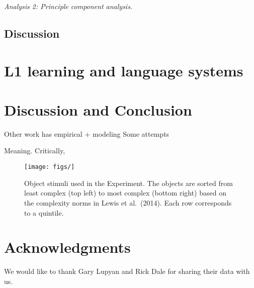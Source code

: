 \documentclass[10pt,letterpaper]{article}
\newcommand{\squeezeup}{\vspace{-1.5mm}}
\begin{document}
{\it Analysis 2: Principle component analysis.}

\subsection{Discussion}



\section{L1 learning and language systems}
\cite{luniewska2015ratings}


\section{Discussion and Conclusion}

 Other work has empirical + modeling
Some attempts
\cite{silvey2015word}
\cite{perfors2011language}




\cite{wichmann2011phonological}
\cite{wichmann2008languagephonological}
\cite{smith2010eliminating}
\cite{slobin1982children}

\cite{sapir1912language}
\cite{reali2014paradox}


\cite{lupyanrole}\cite{lupyan2010language}
\cite{kirby2008cumulative}
Meaning. \cite{silvey2015word}
\cite{perfors2011language}
Critically, 




\begin{figure}[b!]
\begin{center}
\texttt{[image: figs/]}
\end{center}
\vspace{-.24em}
\caption{Object stimuli used in the Experiment. The objects are sorted from least complex (top left) to most complex (bottom right) based on the complexity norms in Lewis et al.\ (2014). Each row corresponds to a quintile.}
\label{fig:objs}
\vspace{-1em}
\end{figure}

\section{Acknowledgments}
We would like to thank Gary Lupyan and Rick Dale for sharing their data with us.




\setlength{\bibleftmargin}{.125in}
\setlength{\bibindent}{-\bibleftmargin}


\end{document}
